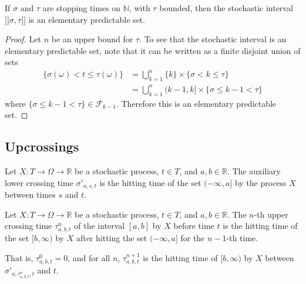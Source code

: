\begin{lemma}\label{lem:elementaryPredictableSet_stochasticInterval}
  \leanok
If $\sigma$ and $\tau$ are stopping times on $\mathbb{N}$, with $\tau$ bounded, then the stochastic interval $]\!]\sigma, \tau]\!]$ is an elementary predictable set.
\end{lemma}

\begin{proof}\leanok
Let $n$ be an upper bound for $\tau$.
To see that the stochastic interval is an elementary predictable set, note that it can be written as a finite disjoint union of sets
\begin{align*}
  \{\sigma(\omega) < t \le \tau(\omega)\}
  &= \bigcup_{k=1}^{n} \{k\} \times \{\sigma < k \le \tau\}
  \\ &= \bigcup_{k=1}^{n} (k-1, k] \times \{\sigma \le k-1 < \tau\}
\end{align*}
where $\{\sigma \le k-1 < \tau\} \in \mathcal{F}_{k-1}$.
Therefore this is an elementary predictable set.
\end{proof}


\subsection{Upcrossings}


\begin{definition}\label{def:lowerCrossingTimeAux}
  \mathlibok
Let $X : T \to \Omega \to \mathbb{R}$ be a stochastic process, $t \in T$, and $a, b \in \mathbb{R}$.
The auxiliary lower crossing time $\sigma'_{a, s, t}$ is the hitting time of the set $(-\infty, a]$ by the process $X$ between times $s$ and $t$.
\end{definition}


\begin{definition}\label{def:upperCrossingTime}
  \mathlibok
Let $X : T \to \Omega \to \mathbb{R}$ be a stochastic process, $t \in T$, and $a, b \in \mathbb{R}$.
The $n$-th upper crossing time $\tau^n_{a, b, t}$ of the interval $[a, b]$ by $X$ before time $t$ is the hitting time of the set $[b, \infty)$ by $X$ after hitting the set $(-\infty, a]$ for the $n-1$-th time.

That is, $\tau^0_{a, b, t} = 0$, and for all $n$, $\tau^{n+1}_{a, b, t}$ is the hitting time of $[b, \infty)$ by $X$ between $\sigma'_{a, \tau^{n}_{a, b, t}, t}$ and $t$.
\end{definition}


